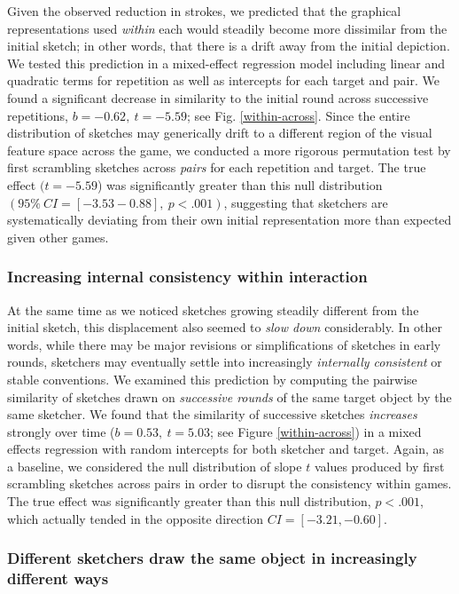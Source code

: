 \documentclass[10pt,letterpaper]{article}
\begin{document}
Given the observed reduction in strokes, we predicted that the graphical representations used \emph{within} each would steadily become more dissimilar from the initial sketch; in other words, that there is a drift away from the initial depiction.
We tested this prediction in a mixed-effect regression model including linear and quadratic terms for repetition as well as intercepts for each target and pair.
We found a significant decrease in similarity to the initial round across successive repetitions, $b = -0.62,~t = -5.59$; see Fig. \ref{within-across}.
Since the entire distribution of sketches may generically drift to a different region of the visual feature space across the game, we conducted a more rigorous permutation test by first scrambling sketches across \emph{pairs} for each repetition and target.
The true effect $(t = -5.59$) was significantly greater than this null distribution $(95\%~CI= [-3.53 -0.88], ~p < .001)$, suggesting that sketchers are systematically deviating from their own initial representation more than expected given other games.

\subsubsection{Increasing internal consistency within interaction}

At the same time as we noticed sketches growing steadily different from the initial sketch, this displacement also seemed to \emph{slow down} considerably.
In other words, while there may be major revisions or simplifications of sketches in early rounds, sketchers may eventually settle into  increasingly \emph{internally consistent} or stable conventions.
We examined this prediction by computing the pairwise similarity of sketches drawn on \emph{successive rounds} of the same target object by the same sketcher.
We found that the similarity of successive sketches \emph{increases} strongly over time ($b = 0.53,~t = 5.03$; see Figure \ref{within-across}) in a mixed effects regression with random intercepts for both sketcher and target.
Again, as a baseline, we considered the null distribution of slope $t$ values produced by first scrambling sketches across pairs in order to disrupt the consistency within games.
The true effect was significantly greater than this null distribution, $p < .001$, which actually tended in the opposite direction $CI = [-3.21, -0.60]$.

\subsubsection{Different sketchers draw the same object in increasingly different ways}
\end{document}
